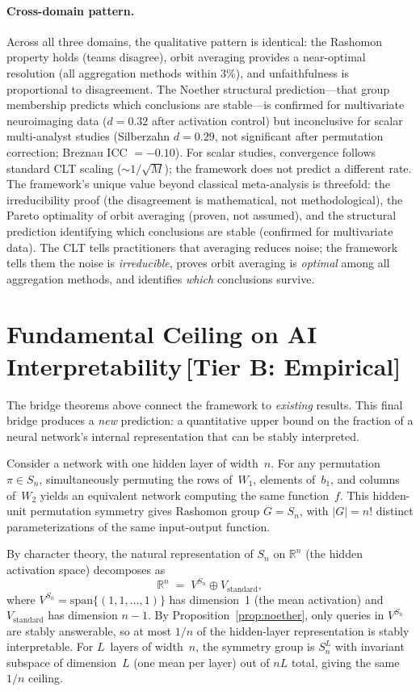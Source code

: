 \documentclass[11pt,a4paper]{article}
\newcommand{\R}{\mathbb{R}}
\begin{document}
\paragraph{Cross-domain pattern.}
Across all three domains, the qualitative pattern is identical: the Rashomon property holds (teams disagree), orbit averaging provides a near-optimal resolution (all aggregation methods within 3\%), and unfaithfulness is proportional to disagreement.  The Noether structural prediction---that group membership predicts which conclusions are stable---is confirmed for multivariate neuroimaging data ($d = 0.32$ after activation control) but inconclusive for scalar multi-analyst studies (Silberzahn $d = 0.29$, not significant after permutation correction; Breznau ICC $= -0.10$).  For scalar studies, convergence follows standard CLT scaling ($\sim 1/\sqrt{M}$); the framework does not predict a different rate.  The framework's unique value beyond classical meta-analysis is threefold: the irreducibility proof (the disagreement is mathematical, not methodological), the Pareto optimality of orbit averaging (proven, not assumed), and the structural prediction identifying which conclusions are stable (confirmed for multivariate data).  The CLT tells practitioners that averaging reduces noise; the framework tells them the noise is \emph{irreducible}, proves orbit averaging is \emph{optimal} among all aggregation methods, and identifies \emph{which} conclusions survive.

\section{Fundamental Ceiling on AI Interpretability\,\textnormal{\normalsize[Tier B: Empirical]}}
\label{sec:bridge-interpretability}

The bridge theorems above connect the framework to \emph{existing} results.
This final bridge produces a \emph{new} prediction: a quantitative upper bound
on the fraction of a neural network's internal representation that can be
stably interpreted.

Consider a network with one hidden layer of width~$n$.  For any permutation
$\pi \in S_n$, simultaneously permuting the rows of~$W_1$, elements of~$b_1$,
and columns of~$W_2$ yields an equivalent network computing the same
function~$f$.  This hidden-unit permutation symmetry gives Rashomon group
$G = S_n$, with $|G| = n!$ distinct parameterizations of the same input-output
function.

By character theory, the natural representation of $S_n$ on $\R^n$
(the hidden activation space) decomposes as
\[
  \R^n \;=\; V^{S_n} \oplus V_{\text{standard}},
\]
where $V^{S_n} = \mathrm{span}\{(1,1,\ldots,1)\}$ has dimension~1 (the mean
activation) and $V_{\text{standard}}$ has dimension $n-1$.  By
Proposition~\ref{prop:noether}, only queries in $V^{S_n}$ are stably
answerable, so at most $1/n$ of the hidden-layer representation is stably
interpretable.  For $L$~layers of width~$n$, the symmetry group is $S_n^L$
with invariant subspace of dimension~$L$ (one mean per layer) out of $nL$
total, giving the same $1/n$ ceiling.
\end{document}
